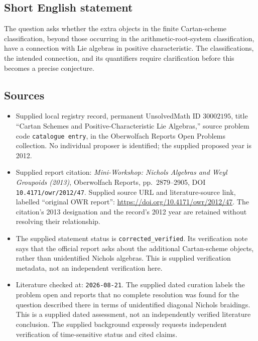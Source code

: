 \documentclass[11pt]{article}
\begin{document}
\subsection{Short English statement}
The question asks whether the extra objects in the finite Cartan-scheme classification, beyond those occurring in the arithmetic-root-system classification, have a connection with Lie algebras in positive characteristic. The classifications, the intended connection, and its quantifiers require clarification before this becomes a precise conjecture.
\subsection{Sources}
\begin{itemize}
\item Supplied local registry record, permanent UnsolvedMath ID \(30002195\), title ``Cartan Schemes and Positive-Characteristic Lie Algebras,'' source problem code \texttt{catalogue entry}, in the Oberwolfach Reports Open Problems collection. No individual proposer is identified; the supplied proposed year is 2012.
\item Supplied report citation: \emph{Mini-Workshop: Nichols Algebras and Weyl Groupoids (2013)}, Oberwolfach Reports, pp.\ 2879--2905, DOI \texttt{10.4171/owr/2012/47}. Supplied source URL and literature-source link, labelled ``original OWR report'': \url{https://doi.org/10.4171/owr/2012/47}. The citation's 2013 designation and the record's 2012 year are retained without resolving their relationship.
\item The supplied statement status is \texttt{corrected\_verified}. Its verification note says that the official report asks about the additional Cartan-scheme objects, rather than unidentified Nichols algebras. This is supplied verification metadata, not an independent verification here.
\item Literature checked at: \texttt{2026-08-21}. The supplied dated curation labels the problem open and reports that no complete resolution was found for the question described there in terms of unidentified diagonal Nichols braidings. This is a supplied dated assessment, not an independently verified literature conclusion. The supplied background expressly requests independent verification of time-sensitive status and cited claims.
\end{itemize}
\end{document}
